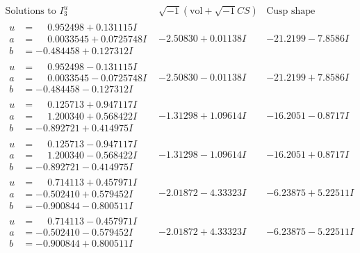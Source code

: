 \documentclass[1p]{elsarticle_modified}
\theoremstyle{definition}
\newcommand{\I}{\sqrt{-1}}
\begin{document}
$$\begin{array}{c|c|c}  
\text{Solutions to }I^u_{3}& \I (\text{vol} + \sqrt{-1}CS) & \text{Cusp shape}\\
 \hline 
\begin{aligned}
u &= \phantom{-}0.952498 + 0.131115 I \\
a &= \phantom{-}0.0033545 + 0.0725748 I \\
b &= -0.484458 + 0.127312 I\end{aligned}
 & -2.50830 + 0.01138 I & -21.2199 - 7.8586 I \\ \hline\begin{aligned}
u &= \phantom{-}0.952498 - 0.131115 I \\
a &= \phantom{-}0.0033545 - 0.0725748 I \\
b &= -0.484458 - 0.127312 I\end{aligned}
 & -2.50830 - 0.01138 I & -21.2199 + 7.8586 I \\ \hline\begin{aligned}
u &= \phantom{-}0.125713 + 0.947117 I \\
a &= \phantom{-}1.200340 + 0.568422 I \\
b &= -0.892721 + 0.414975 I\end{aligned}
 & -1.31298 + 1.09614 I & -16.2051 - 0.8717 I \\ \hline\begin{aligned}
u &= \phantom{-}0.125713 - 0.947117 I \\
a &= \phantom{-}1.200340 - 0.568422 I \\
b &= -0.892721 - 0.414975 I\end{aligned}
 & -1.31298 - 1.09614 I & -16.2051 + 0.8717 I \\ \hline\begin{aligned}
u &= \phantom{-}0.714113 + 0.457971 I \\
a &= -0.502410 + 0.579452 I \\
b &= -0.900844 - 0.800511 I\end{aligned}
 & -2.01872 - 4.33323 I & -6.23875 + 5.22511 I \\ \hline\begin{aligned}
u &= \phantom{-}0.714113 - 0.457971 I \\
a &= -0.502410 - 0.579452 I \\
b &= -0.900844 + 0.800511 I\end{aligned}
 & -2.01872 + 4.33323 I & -6.23875 - 5.22511 I \\ \hline\begin{aligned}

\end{aligned}
\end{array}$$
\end{document}
